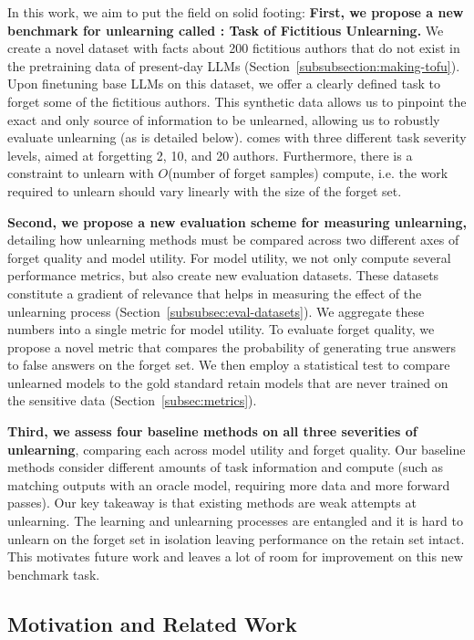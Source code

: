 In this work, we aim to put the field on solid footing: \textbf{First, we propose a new benchmark for unlearning called \tofu{}: Task of Fictitious Unlearning.}
We create a novel dataset with facts about 200 fictitious authors that do not exist in the pretraining data of present-day LLMs (Section~\ref{subsubsection:making-tofu}). 
Upon finetuning base LLMs on this dataset, we offer a clearly defined task  to forget some of the fictitious authors. 
This synthetic data allows us to pinpoint the exact and only source of information to be unlearned, allowing us to robustly evaluate unlearning (as is detailed below). 
\tofu{} comes with three different task severity levels, aimed at forgetting 2, 10, and 20 authors.
Furthermore, there is a constraint to unlearn with $O$(number of forget samples) compute, i.e. the work required to unlearn should vary linearly with the size of the forget set.

\textbf{Second, we propose a new evaluation scheme for measuring unlearning,} detailing how unlearning methods must be compared across two different axes of forget quality and model utility.
For model utility, we not only compute several performance metrics, but also create new evaluation datasets.
These datasets constitute a gradient of relevance that helps in measuring the effect of the unlearning process (Section~\ref{subsubsec:eval-datasets}). 
We aggregate these numbers into a single metric for model utility.
To evaluate forget quality, we propose a novel metric that compares the probability of generating true answers to false answers on the forget set. 
We then employ a statistical test to compare unlearned models to the gold standard retain models that are never trained on the sensitive data (Section~\ref{subsec:metrics}).

\textbf{Third, we assess four baseline methods on all three severities of unlearning}, comparing each across model utility and forget quality.
Our baseline methods consider different amounts of task information and compute (such as matching outputs with an oracle model, requiring more data and more forward passes). 
Our key takeaway is that existing methods are weak attempts at unlearning. 
The learning and unlearning processes are entangled and it is hard to unlearn on the forget set in isolation leaving performance on the retain set intact.
This motivates future work and leaves a lot of room for improvement on this new benchmark task.

\subsection{Motivation and Related Work}
\label{sec:related-work}

